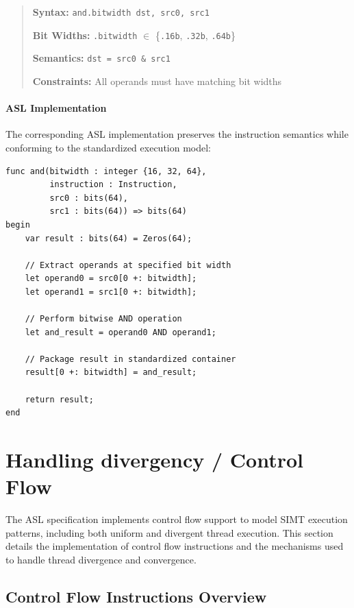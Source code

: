 \begin{quote}
\textbf{Syntax:} \texttt{and.bitwidth dst, src0, src1}

\textbf{Bit Widths:} \texttt{.bitwidth} $\in$ \{\texttt{.16b}, \texttt{.32b},
\texttt{.64b}\}

\textbf{Semantics:} \texttt{dst = src0 \& src1}

\textbf{Constraints:} All operands must have matching bit widths
\end{quote}

\paragraph{ASL Implementation}
The corresponding ASL implementation preserves the instruction semantics while
conforming to the standardized execution model:

\begin{lstlisting}[caption={ASL Bitwise AND Implementation}, label={lst:and_asl_impl}]
func and(bitwidth : integer {16, 32, 64},
         instruction : Instruction,
         src0 : bits(64),
         src1 : bits(64)) => bits(64)
begin
    var result : bits(64) = Zeros(64);
    
    // Extract operands at specified bit width
    let operand0 = src0[0 +: bitwidth];
    let operand1 = src1[0 +: bitwidth];
    
    // Perform bitwise AND operation
    let and_result = operand0 AND operand1;
    
    // Package result in standardized container
    result[0 +: bitwidth] = and_result;
    
    return result;
end
\end{lstlisting}

\section{Handling divergency / Control Flow}


The ASL specification implements control flow support to model SIMT execution
patterns, including both uniform and divergent thread execution. This section
details the implementation of control flow instructions and the mechanisms used
to handle thread divergence and convergence.

\subsection{Control Flow Instructions Overview}
\label{subsec:control_flow_overview}

